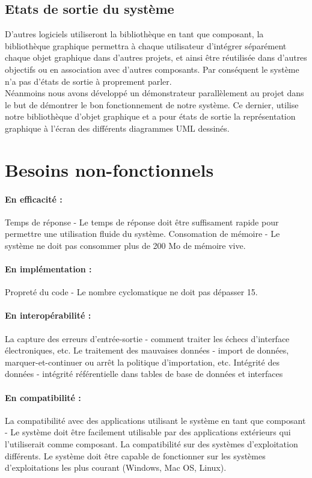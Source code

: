 \documentclass[12pt,a4paper,openany]{report}
\begin{document}
	\subsection{Etats de sortie du système}
	D'autres logiciels utiliseront la bibliothèque en tant que composant, la bibliothèque graphique
	permettra à chaque utilisateur d'intégrer séparément chaque objet graphique dans d'autres projets,
	et ainsi être réutilisée dans d'autres objectifs ou en association avec d'autres composants.
	Par conséquent le système n'a pas d'états de sortie à proprement parler.\\
	Néanmoins nous avons développé un démonstrateur parallèlement au projet dans le but de démontrer
	le bon fonctionnement de notre système.
	Ce dernier, utilise notre bibliothèque d'objet graphique et a pour états de sortie la représentation
	graphique à l'écran des différents diagrammes UML dessinés. %

	\section{Besoins non-fonctionnels}
		\paragraph{En efficacité :}
		Temps de réponse - Le temps de réponse doit être suffisament rapide pour permettre une utilisation fluide du système.
		Consomation de mémoire - Le système ne doit pas consommer plus de 200 Mo de mémoire vive.
		\paragraph{En implémentation :}
		Propreté du code - Le nombre cyclomatique ne doit pas dépasser 15.
		\paragraph{En interopérabilité :}
		La capture des erreurs d'entrée-sortie - comment traiter les échecs d'interface électroniques, etc.
		Le traitement des mauvaises données - import de données, marquer-et-continuer ou arrêt la politique d'importation, etc.
		Intégrité des données - intégrité référentielle dans tables de base de données et interfaces
		\paragraph{En compatibilité :}
		La compatibilité avec des applications utilisant le système en tant que composant - Le système doit être facilement
		utilisable par des applications extérieurs qui l'utiliserait comme composant.
		La compatibilité sur des systèmes d'exploitation différents. Le système doit être capable de fonctionner sur les 
		systèmes d'exploitations les plus courant (Windows, Mac OS, Linux).
\end{document}
